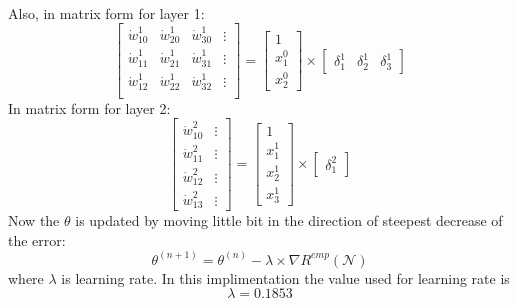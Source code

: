 \documentclass[a4paper,11pt]{article}
\begin{document}
\\
Also, in matrix form for layer 1:
$$
\left[
\begin{matrix}
	\dot{w}_{10}^1 & \dot{w}_{20}^1 & \dot{w}_{30}^1 & \vdots\\
	\dot{w}_{11}^1 & \dot{w}_{21}^1 & \dot{w}_{31}^1& \vdots\\
	\dot{w}_{12}^1 & \dot{w}_{22}^1 & \dot{w}_{32}^1 & \vdots\\
\end{matrix}
\right]
= 
\left[
\begin{matrix}
	1\\x_1^0 \\x_2^0
\end{matrix}
\right]
\times
\left[
\begin{matrix}
	\delta_1^1 & \delta_2^1 & \delta_3^1
\end{matrix}
\right]
$$
In matrix form for layer 2:
$$
\left[
\begin{matrix}
	\dot{w}_{10}^2 &\vdots \\ \dot{w}_{11}^2 &\vdots \\ \dot{w}_{12}^2 &\vdots \\ \dot{w}_{13}^2  & \vdots
\end{matrix}
\right]
= 
\left[
\begin{matrix}
		1\\x_1^1 \\ x_2^1 \\ x_3^1
\end{matrix}
\right]
\times
\left[
\begin{matrix}
\delta_1^2	
\end{matrix}
\right]
$$
Now the $\theta$ is updated by moving little bit in the direction of steepest decrease of the error:
\begin{equation}
\theta^{(n+1)} = \theta^{(n)} - \lambda\times \nabla R^{emp}(\mathcal{N})
\end{equation}
where $\lambda$ is learning rate. In this implimentation the value used for learning rate is 
$$\lambda = 0.1853 $$
\end{document}
